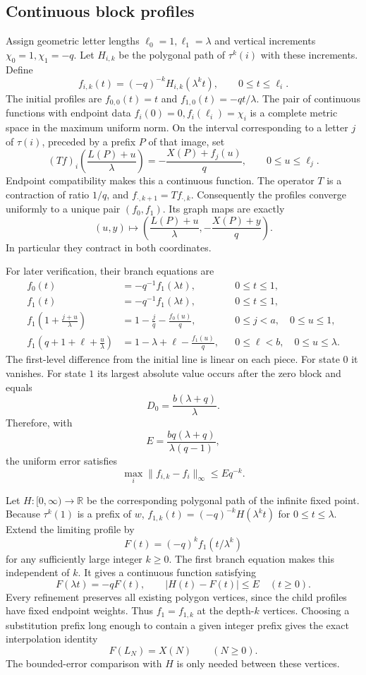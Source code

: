 \documentclass[11pt]{article}
\numberwithin{equation}{section}
\theoremstyle{definition}
\theoremstyle{remark}
\begin{document}
\subsection{Continuous block profiles}

Assign geometric letter lengths $\ell_0=1,\ell_1=\lambda$ and vertical
increments $\chi_0=1,\chi_1=-q$. Let $H_{i,k}$ be the polygonal path of
$\tau^k(i)$ with these increments. Define
\[
 f_{i,k}(t)=(-q)^{-k}H_{i,k}(\lambda^k t),
 \qquad 0\leq t\leq\ell_i.
\]
The initial profiles are $f_{0,0}(t)=t$ and $f_{1,0}(t)=-qt/\lambda$.
The pair of continuous functions with endpoint data
$f_i(0)=0,f_i(\ell_i)=\chi_i$ is a complete metric space in the maximum
uniform norm. On the interval corresponding to a letter $j$ of $\tau(i)$,
preceded by a prefix $P$ of that image, set
\[
 (Tf)_i\left(\frac{L(P)+u}{\lambda}\right)
    =-\frac{X(P)+f_j(u)}q,
 \qquad 0\leq u\leq\ell_j.
\]
Endpoint compatibility makes this a continuous function. The operator $T$
is a contraction of ratio $1/q$, and $f_{\cdot,k+1}=Tf_{\cdot,k}$.
Consequently the profiles converge uniformly to a unique pair $(f_0,f_1)$.
Its graph maps are exactly
\[
 (u,y)\longmapsto
 \left(\frac{L(P)+u}{\lambda},-\frac{X(P)+y}{q}\right).
\]
In particular they contract in both coordinates.

For later verification, their branch equations are
\begin{align*}
 f_0(t)&=-q^{-1}f_1(\lambda t), &&0\leq t\leq1,\\
 f_1(t)&=-q^{-1}f_1(\lambda t), &&0\leq t\leq1,\\
 f_1\left(1+\frac{j+u}{\lambda}\right)
   &=1-\frac jq-\frac{f_0(u)}q,
   &&0\leq j<a,\quad0\leq u\leq1,\\
 f_1\left(q+1+\ell+\frac u\lambda\right)
   &=1-\lambda+\ell-\frac{f_1(u)}q,
   &&0\leq\ell<b,\quad0\leq u\leq\lambda.
\end{align*}
The first-level difference from the initial line is linear on each piece.
For state $0$ it vanishes. For state $1$ its largest absolute value occurs
after the zero block and equals
\[
 D_0=\frac{b(\lambda+q)}\lambda.
\]
Therefore, with
\[
 E=\frac{bq(\lambda+q)}{\lambda(q-1)},
\]
the uniform error satisfies
\[
 \max_i\|f_{i,k}-f_i\|_\infty\leq E q^{-k}.
\]

Let $H:[0,\infty)\to\mathbb R$ be the corresponding polygonal path of
the infinite fixed point. Because $\tau^k(1)$ is a prefix of $w$,
$f_{1,k}(t)=(-q)^{-k}H(\lambda^k t)$ for $0\leq t\leq\lambda$.
Extend the limiting profile by
\[
 F(t)=(-q)^k f_1(t/\lambda^k)
\]
for any sufficiently large integer $k\geq0$. The first branch equation
makes this independent of $k$. It gives a continuous function satisfying
\[
 F(\lambda t)=-qF(t),\qquad |H(t)-F(t)|\leq E
 \quad(t\geq0).
\]
Every refinement preserves all existing polygon vertices, since the child
profiles have fixed endpoint weights. Thus $f_1=f_{1,k}$ at the depth-$k$
vertices. Choosing a substitution prefix long enough to contain a given
integer prefix gives the exact interpolation identity
\[
 F(L_N)=X(N)\qquad(N\geq0).
\]
The bounded-error comparison with $H$ is only needed between these vertices.
\end{document}
